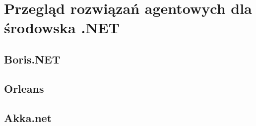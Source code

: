 \section{Przegląd rozwiązań agentowych dla środowska .NET}
\subsection{Boris.NET}
\subsection{Orleans}
\subsection{Akka.net}
